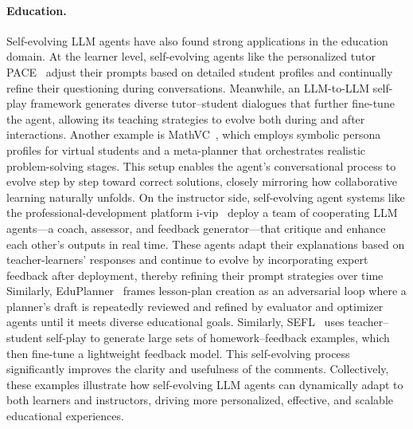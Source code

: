 \documentclass[10pt]{article} %
\begin{document}
\paragraph{Education.}

Self-evolving LLM agents have also found strong applications in the education domain.
At the learner level, self-evolving agents like the personalized tutor PACE~\citep{liu2025pace} adjust their prompts based on detailed student profiles and continually refine their questioning during conversations. Meanwhile, an LLM-to-LLM self-play framework generates diverse tutor–student dialogues that further fine-tune the agent, allowing its teaching strategies to evolve both during and after interactions.
Another example is MathVC~\citep{yue2025mathvc}, which employs symbolic persona profiles for virtual students and a meta-planner that orchestrates realistic problem-solving stages. This setup enables the agent’s conversational process to evolve step by step toward correct solutions, closely mirroring how collaborative learning naturally unfolds.
On the instructor side, self-evolving agent systems like the professional-development platform i‑vip~\citep{yang2025ivip} deploy a team of cooperating LLM agents—a coach, assessor, and feedback generator—that critique and enhance each other’s outputs in real time. These agents adapt their explanations based on teacher-learners’ responses and continue to evolve by incorporating expert feedback after deployment, thereby refining their prompt strategies over time
Similarly,  EduPlanner~\citep{zhang2025eduplanner} frames lesson-plan creation as an adversarial loop where a planner’s draft is repeatedly reviewed and refined by evaluator and optimizer agents until it meets diverse educational goals.
Similarly, \textsc{SEFL}~\citep{zhang2025sefl} uses teacher–student self-play to generate large sets of homework–feedback examples, which then fine-tune a lightweight feedback model. This self-evolving process significantly improves the clarity and usefulness of the comments.
Collectively, these examples illustrate how self-evolving LLM agents can dynamically adapt to both learners and instructors, driving more personalized, effective, and scalable educational experiences.
\end{document}
